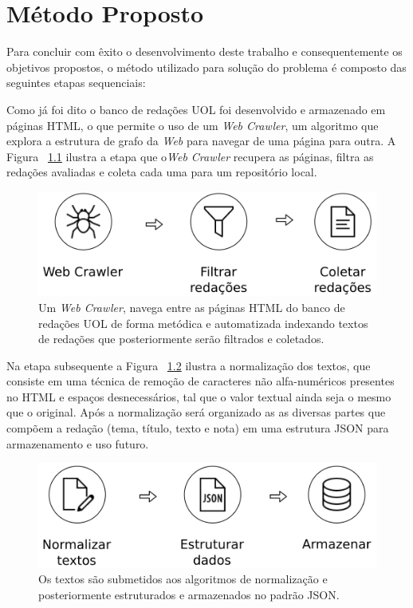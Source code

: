 \chapter{Método Proposto}\label{meto}

Para concluir com êxito o desenvolvimento deste trabalho e consequentemente os objetivos propostos, o método utilizado para solução do problema é composto das seguintes etapas sequenciais:

Como já foi dito o banco de redações UOL foi desenvolvido e armazenado em páginas HTML, o que permite o uso de um \textit{Web Crawler}, um algoritmo que explora a estrutura de grafo da \textit{Web} para navegar de uma página para outra. A Figura ~\ref{fig:metodologia_1} ilustra a etapa que o\textit{Web Crawler} recupera as páginas, filtra as redações avaliadas e coleta cada uma para um repositório local.

\begin{figure}[H]
\begin{center}
    \includegraphics[scale=0.75]{figuras/metodologia_1.png}
\end{center}
\caption{Um \textit{Web Crawler}, navega entre as páginas HTML do banco de redações UOL de forma metódica e automatizada indexando textos de redações que posteriormente serão filtrados e coletados.}
\label{fig:metodologia_1}
\end{figure}

Na etapa subsequente a Figura ~\ref{fig:metodologia_2} ilustra a normalização dos textos, que consiste em uma técnica de remoção de caracteres não alfa-numéricos presentes no HTML e espaços desnecessários, tal que o valor textual ainda seja o mesmo que o original. Após a normalização será organizado as as diversas partes que compõem a redação (tema, título, texto e nota) em uma estrutura JSON para armazenamento e uso futuro. 

\begin{figure}[H]
\begin{center}
    \includegraphics[scale=0.75]{figuras/metodologia_2.png}
\end{center}
\caption{Os textos são submetidos aos algoritmos de normalização e posteriormente estruturados e armazenados no padrão JSON.}
\label{fig:metodologia_2}
\end{figure}

